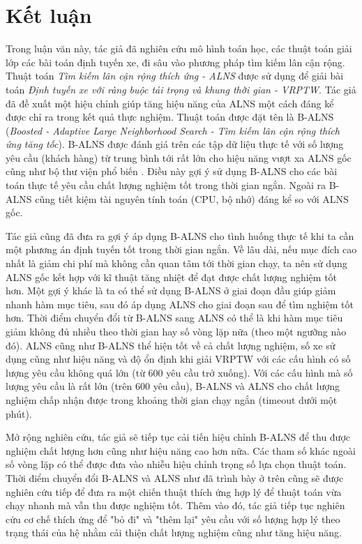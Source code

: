 \chapter*{Kết luận}
\label{chap:conclusion}

Trong luận văn này, tác giả đã nghiên cứu mô hình toán học, các thuật toán giải lớp các bài toán định tuyến xe, đi sâu vào phương pháp tìm kiếm lân cận rộng. Thuật toán \textit{Tìm kiếm lân cận rộng thích ứng - ALNS} được sử dụng để giải bài toán \textit{Định tuyến xe với ràng buộc tải trọng và khung thời gian - VRPTW}. Tác giả đã đề xuất một hiệu chỉnh giúp tăng hiệu năng của ALNS một cách đáng kể được chỉ ra trong kết quả thực nghiệm. Thuật toán được đặt tên là B-ALNS (\textit{Boosted - Adaptive Large Neighborhood Search - Tìm kiếm lân cận rộng thích ứng tăng tốc}). B-ALNS được đánh giá trên các tập dữ liệu thực tế với số lượng yêu cầu (khách hàng) từ trung bình tới rất lớn cho hiệu năng vượt xa ALNS gốc cũng như bộ thư viện phổ biến . Điều này gợi ý sử dụng B-ALNS cho các bài toán thực tế yêu cầu chất lượng nghiệm tốt trong thời gian ngắn. Ngoài ra B-ALNS cũng tiết kiệm tài nguyên tính toán (CPU, bộ nhớ) đáng kể so với ALNS gốc.

Tác giả cũng đã đưa ra gợi ý áp dụng B-ALNS cho tình huống thực tế khi ta cần một phương án định tuyến tốt trong thời gian ngắn. Về lâu dài, nếu mục đích cao nhất là giảm chi phí mà không cần quan tâm tới thời gian chạy, ta nên sử dụng ALNS gốc kết hợp với kĩ thuật tăng nhiệt để đạt được chất lượng nghiệm tốt hơn. Một gợi ý khác là ta có thể sử dụng B-ALNS ở giai đoạn đầu giúp giảm nhanh hàm mục tiêu, sau đó áp dụng ALNS cho giai đoạn sau để tìm nghiệm tốt hơn. Thời điểm chuyển đổi từ B-ALNS sang ALNS có thể là khi hàm mục tiêu giảm không đủ nhiều theo thời gian hay số vòng lặp nữa (theo một ngưỡng nào đó). ALNS cũng như B-ALNS thể hiện tốt về cả chất lượng nghiệm, số xe sử dụng cũng như hiệu năng và độ ổn định khi giải VRPTW với các cấu hình có số lượng yêu cầu không quá lớn (từ $600$ yêu cầu trở xuống). Với các cấu hình mà số lượng yêu cầu là rất lớn (trên $600$ yêu cầu), B-ALNS và ALNS cho chất lượng nghiệm chấp nhận được trong khoảng thời gian chạy ngắn (timeout dưới một phút).

Mở rộng nghiên cứu, tác giả sẽ tiếp tục cải tiến hiệu chỉnh B-ALNS để thu được nghiệm chất lượng hơn cũng như hiệu năng cao hơn nữa. Các tham số khác ngoài số vòng lặp có thể được đưa vào nhiễu hiệu chỉnh trọng số lựa chọn thuật toán. Thời điểm chuyển đổi B-ALNS và ALNS như đã trình bày ở trên cũng sẽ được nghiên cứu tiếp để đưa ra một chiến thuật thích ứng hợp lý để thuật toán vừa chạy nhanh mà vẫn thu được nghiệm tốt. Thêm vào đó, tác giả tiếp tục nghiên cứu cơ chế thích ứng để "bỏ đi" và "thêm lại" yêu cầu với số lượng hợp lý theo trạng thái của hệ nhằm cải thiện chất lượng nghiệm cũng như tăng hiệu năng.

